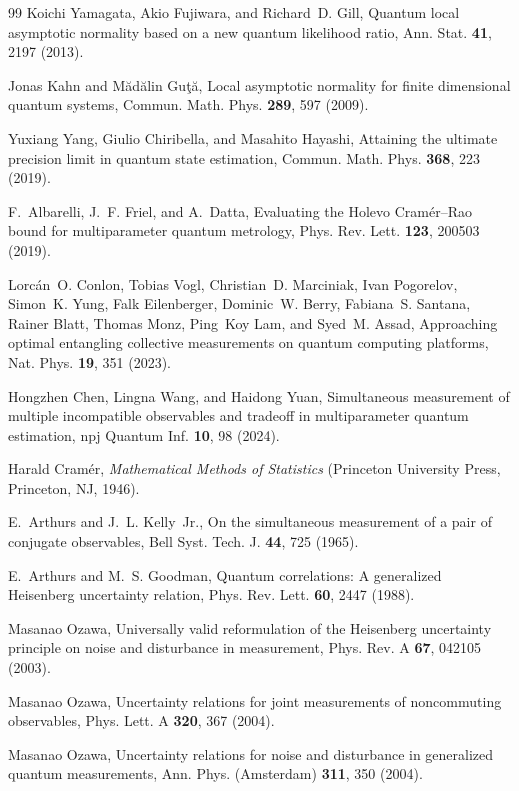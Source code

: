 \documentclass[
aps,
prl,
twocolumn,

superscriptaddress]{revtex4-2}
\begin{document}
\begin{thebibliography}{99}
Koichi Yamagata, Akio Fujiwara, and Richard~D. Gill, Quantum local asymptotic
normality based on a new quantum likelihood ratio, Ann. Stat. \textbf{41},
2197 (2013).

Jonas Kahn and M\u{a}d\u{a}lin Gu\c{t}\u{a}, Local asymptotic normality for
finite dimensional quantum systems, Commun. Math. Phys. \textbf{289}, 597
(2009).

Yuxiang Yang, Giulio Chiribella, and Masahito Hayashi, Attaining the ultimate
precision limit in quantum state estimation, Commun. Math. Phys. \textbf{368},
223 (2019).

F.~Albarelli, J.~F. Friel, and A.~Datta, Evaluating the Holevo Cram{\'e}r--Rao
bound for multiparameter quantum metrology, Phys. Rev. Lett. \textbf{123},
200503 (2019).

Lorc{\'a}n~O. Conlon, Tobias Vogl, Christian~D. Marciniak, Ivan Pogorelov,
Simon~K. Yung, Falk Eilenberger, Dominic~W. Berry, Fabiana~S. Santana, Rainer
Blatt, Thomas Monz, Ping~Koy Lam, and Syed~M. Assad, Approaching optimal
entangling collective measurements on quantum computing platforms, Nat. Phys.
\textbf{19}, 351 (2023).

Hongzhen Chen, Lingna Wang, and Haidong Yuan, Simultaneous measurement of
multiple incompatible observables and tradeoff in multiparameter quantum
estimation, npj Quantum Inf. \textbf{10}, 98 (2024).

Harald Cram{\'e}r, \textit{Mathematical Methods of Statistics}
(Princeton University Press, Princeton, NJ, 1946).

E.~Arthurs and J.~L. Kelly~Jr., On the simultaneous measurement of a pair of
conjugate observables, Bell Syst. Tech. J. \textbf{44}, 725 (1965).

E.~Arthurs and M.~S. Goodman, Quantum correlations: A generalized Heisenberg
uncertainty relation, Phys. Rev. Lett. \textbf{60}, 2447 (1988).

Masanao Ozawa, Universally valid reformulation of the Heisenberg uncertainty
principle on noise and disturbance in measurement, Phys. Rev. A \textbf{67},
042105 (2003).

Masanao Ozawa, Uncertainty relations for joint measurements of noncommuting
observables, Phys. Lett. A \textbf{320}, 367 (2004).

Masanao Ozawa, Uncertainty relations for noise and disturbance in generalized
quantum measurements, Ann. Phys. (Amsterdam) \textbf{311}, 350 (2004).


\end{thebibliography}
\end{document}

